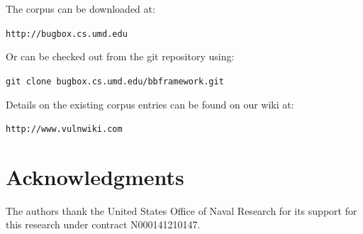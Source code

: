 \documentclass[letterpaper,twocolumn,10pt]{article}
\begin{document}
The corpus can be downloaded at:

\begin{center}
{\tt  http://bugbox.cs.umd.edu}
\end{center}

Or can be checked out from the git repository using:

\begin{center}
{\tt git clone bugbox.cs.umd.edu/bbframework.git}
\end{center}

Details on the existing corpus entries can be found on our wiki at:

\begin{center}
{\tt http://www.vulnwiki.com}
\end{center}

\section*{Acknowledgments}

The authors thank the United States Office of Naval Research for its support for this research under contract N000141210147.





{\footnotesize 
}
\end{document}
